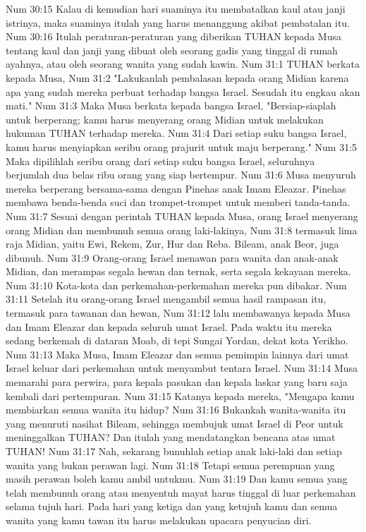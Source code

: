 Num 30:15  Kalau di kemudian hari suaminya itu membatalkan kaul atau janji istrinya, maka suaminya itulah yang harus menanggung akibat pembatalan itu.
Num 30:16  Itulah peraturan-peraturan yang diberikan TUHAN kepada Musa tentang kaul dan janji yang dibuat oleh seorang gadis yang tinggal di rumah ayahnya, atau oleh seorang wanita yang sudah kawin.
Num 31:1  TUHAN berkata kepada Musa,
Num 31:2  "Lakukanlah pembalasan kepada orang Midian karena apa yang sudah mereka perbuat terhadap bangsa Israel. Sesudah itu engkau akan mati."
Num 31:3  Maka Musa berkata kepada bangsa Israel, "Bersiap-siaplah untuk berperang; kamu harus menyerang orang Midian untuk melakukan hukuman TUHAN terhadap mereka.
Num 31:4  Dari setiap suku bangsa Israel, kamu harus menyiapkan seribu orang prajurit untuk maju berperang."
Num 31:5  Maka dipilihlah seribu orang dari setiap suku bangsa Israel, seluruhnya berjumlah dua belas ribu orang yang siap bertempur.
Num 31:6  Musa menyuruh mereka berperang bersama-sama dengan Pinehas anak Imam Eleazar. Pinehas membawa benda-benda suci dan trompet-trompet untuk memberi tanda-tanda.
Num 31:7  Sesuai dengan perintah TUHAN kepada Musa, orang Israel menyerang orang Midian dan membunuh semua orang laki-lakinya,
Num 31:8  termasuk lima raja Midian, yaitu Ewi, Rekem, Zur, Hur dan Reba. Bileam, anak Beor, juga dibunuh.
Num 31:9  Orang-orang Israel menawan para wanita dan anak-anak Midian, dan merampas segala hewan dan ternak, serta segala kekayaan mereka.
Num 31:10  Kota-kota dan perkemahan-perkemahan mereka pun dibakar.
Num 31:11  Setelah itu orang-orang Israel mengambil semua hasil rampasan itu, termasuk para tawanan dan hewan,
Num 31:12  lalu membawanya kepada Musa dan Imam Eleazar dan kepada seluruh umat Israel. Pada waktu itu mereka sedang berkemah di dataran Moab, di tepi Sungai Yordan, dekat kota Yerikho.
Num 31:13  Maka Musa, Imam Eleazar dan semua pemimpin lainnya dari umat Israel keluar dari perkemahan untuk menyambut tentara Israel.
Num 31:14  Musa memarahi para perwira, para kepala pasukan dan kepala laskar yang baru saja kembali dari pertempuran.
Num 31:15  Katanya kepada mereka, "Mengapa kamu membiarkan semua wanita itu hidup?
Num 31:16  Bukankah wanita-wanita itu yang menuruti nasihat Bileam, sehingga membujuk umat Israel di Peor untuk meninggalkan TUHAN? Dan itulah yang mendatangkan bencana atas umat TUHAN!
Num 31:17  Nah, sekarang bunuhlah setiap anak laki-laki dan setiap wanita yang bukan perawan lagi.
Num 31:18  Tetapi semua perempuan yang masih perawan boleh kamu ambil untukmu.
Num 31:19  Dan kamu semua yang telah membunuh orang atau menyentuh mayat harus tinggal di luar perkemahan selama tujuh hari. Pada hari yang ketiga dan yang ketujuh kamu dan semua wanita yang kamu tawan itu harus melakukan upacara penyucian diri.
